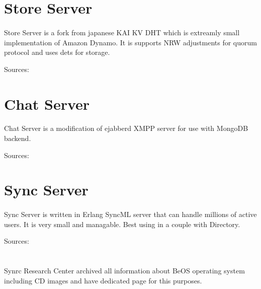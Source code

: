 \documentclass[11pt]{article}
\begin{document}
\section*{Store Server}
\paragraph{}
Store Server is a fork from japanese KAI KV DHT which is
extreamly small implementation of Amazon Dynamo. It is supports 
NRW adjustments for quorum protocol and uses dets for storage.

Sources: 

\section*{Chat Server}
\paragraph{}
Chat Server is a modification of ejabberd XMPP server for use with MongoDB backend.

Sources: 

\section*{Sync Server}
\paragraph{}
Sync Server is written in Erlang SyncML server that can handle
millions of active users. It is very small and managable.
Best using in a couple with Directory.

Sources: 

\section*{}
\paragraph{}
Synrc Research Center archived all information about BeOS operating system 
including CD images and have dedicated page for this purposes.
\end{document}
